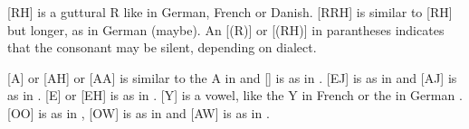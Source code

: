 [RH] is a guttural R like in German, French or Danish. [RRH] is similar to [RH] but longer, as in German  (maybe). An [(R)] or [(RH)] in parantheses indicates that the consonant may be silent, depending on dialect. 

[A] or [AH] or [AA] is similar to the  A in  and [\Aumlaut{}] is as in . [EJ] is as in  and [AJ] is as in . [E] or [EH] is as in . [Y] is a vowel, like the  Y in French  or the  in German . [OO] is as in , [OW] is as in  and [AW] is as in . 









